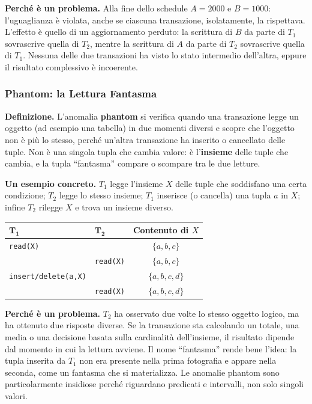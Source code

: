 \documentclass[12pt]{extarticle}
\begin{document}
\noindent \textbf{Perché è un problema.} Alla fine dello schedule $A=2000$ e $B=1000$: l'uguaglianza è violata, anche se ciascuna transazione, isolatamente, la rispettava. L'effetto è quello di un aggiornamento perduto: la scrittura di $B$ da parte di $T_1$ sovrascrive quella di $T_2$, mentre la scrittura di $A$ da parte di $T_2$ sovrascrive quella di $T_1$. Nessuna delle due transazioni ha visto lo stato intermedio dell'altra, eppure il risultato complessivo è incoerente.

\subsubsection{Phantom: la Lettura Fantasma}

\noindent \textbf{Definizione.} L'anomalia \textbf{phantom} si verifica quando una transazione legge un oggetto (ad esempio una tabella) in due momenti diversi e scopre che l'oggetto non è più lo stesso, perché un'altra transazione ha inserito o cancellato delle tuple. Non è una singola tupla che cambia valore: è l'\textbf{insieme} delle tuple che cambia, e la tupla ``fantasma'' compare o scompare tra le due letture.

\medskip
\noindent \textbf{Un esempio concreto.} $T_1$ legge l'insieme $X$ delle tuple che soddisfano una certa condizione; $T_2$ legge lo stesso insieme; $T_1$ inserisce (o cancella) una tupla $a$ in $X$; infine $T_2$ rilegge $X$ e trova un insieme diverso.

\begin{center}
\small
\begin{tabular}{@{}llc@{}}
    \toprule
    $\boldsymbol{T_1}$ & $\boldsymbol{T_2}$ & \textbf{Contenuto di $X$} \\
    \midrule
    \texttt{read(X)}          &      & $\{a,b,c\}$ \\
     & \texttt{read(X)}          & $\{a,b,c\}$ \\
    \texttt{insert/delete(a,X)} &      & $\{a,b,c,d\}$ \\
     & \texttt{read(X)}          & $\{a,b,c,d\}$ \\
    \bottomrule
\end{tabular}
\end{center}

\noindent \textbf{Perché è un problema.} $T_2$ ha osservato due volte lo stesso oggetto logico, ma ha ottenuto due risposte diverse. Se la transazione sta calcolando un totale, una media o una decisione basata sulla cardinalità dell'insieme, il risultato dipende dal momento in cui la lettura avviene. Il nome ``fantasma'' rende bene l'idea: la tupla inserita da $T_1$ non era presente nella prima fotografia e appare nella seconda, come un fantasma che si materializza. Le anomalie phantom sono particolarmente insidiose perché riguardano predicati e intervalli, non solo singoli valori.
\end{document}
